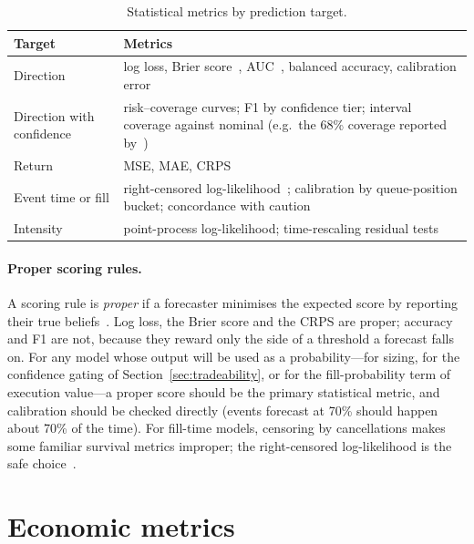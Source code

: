 \begin{table}[!htbp]
\centering\small
\caption{Statistical metrics by prediction target.}
\label{tab:metrics}
\begin{tabularx}{\linewidth}{lX}
\toprule
Target & Metrics \\
\midrule
Direction & log loss, Brier score~\citep{brier1950}, AUC~\citep{fawcett2006}, balanced accuracy, calibration error~\citep{guo2017} \\
Direction with confidence & risk--coverage curves; F1 by confidence tier; interval coverage against
  nominal (e.g.\ the 68\% coverage reported by~\citet{manoharan2026uqlob}) \\
Return & MSE, MAE, CRPS~\citep{gneiting2007} \\
Event time or fill & right-censored log-likelihood~\citep{arroyo2024}; calibration by queue-position bucket; concordance with caution \\
Intensity & point-process log-likelihood; time-rescaling residual tests \\
\bottomrule
\end{tabularx}
\end{table}

\paragraph{Proper scoring rules.} A scoring rule is \emph{proper} if a forecaster minimises the expected
score by reporting their true beliefs~\citep{gneiting2007}. Log loss, the Brier score and the CRPS are
proper; accuracy and F1 are not, because they reward only the side of a threshold a forecast falls on.
For any model whose output will be used as a probability---for sizing, for the confidence gating of
Section~\ref{sec:tradeability}, or for the fill-probability term of execution value---a proper score
should be the primary statistical metric, and calibration should be checked directly (events forecast
at 70\% should happen about 70\% of the time). For fill-time models, censoring by cancellations makes
some familiar survival metrics improper; the right-censored log-likelihood is the safe
choice~\citep{arroyo2024}.

\section{Economic metrics}
\label{sec:econ-metrics}

